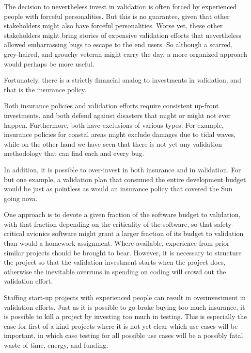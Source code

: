 The decision to nevertheless invest in validation is often forced by
experienced people with forceful personalities.
But this is no guarantee, given that other stakeholders might also
have forceful personalities.
Worse yet, these other stakeholders might bring stories of expensive
validation efforts that nevertheless allowed embarrassing bugs to
escape to the end users.
So although a scarred, grey-haired, and grouchy veteran might carry
the day, a more organized approach would perhaps be more useful.

Fortunately, there is a strictly financial analog to investments in
validation, and that is the insurance policy.


Both insurance policies and validation efforts require consistent
up-front investments, and both defend against disasters that might
or might not ever happen.
Furthermore, both have exclusions of various types.
For example, insurance policies for coastal areas might exclude
damages due to tidal waves, while on the other hand we have seen
that there is not yet any validation methodology that can find
each and every bug.

In addition, it is possible to over-invest in both insurance and
in validation.
For but one example, a validation plan that consumed the entire
development budget would be just as pointless as would an insurance
policy that covered the Sun going nova.

One approach is to devote a given fraction of the software budget to
validation, with that fraction depending on the criticality of the
software, so that safety-critical avionics software might grant a
larger fraction of its budget to validation than would a homework
assignment.
Where available, experience from prior similar projects should be
brought to bear.
However, it is necessary to structure the project so that the validation
investment starts when the project does, otherwise the inevitable overruns
in spending on coding will crowd out the validation effort.

Staffing start-up projects with experienced people can result in
overinvestment in validation efforts.
Just as it is possible to go broke buying too much insurance, it is
possible to kill a project by investing too much in testing.
This is especially the case for first-of-a-kind projects where it is
not yet clear which use cases will be important, in which case testing
for all possible use cases will be a possibly fatal waste of time,
energy, and funding.

